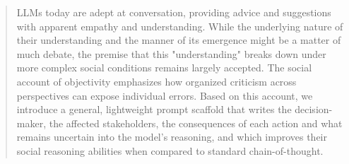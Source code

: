 \begin{abstract}
LLMs today are adept at conversation, providing advice and suggestions with apparent empathy and understanding. While the underlying nature of their understanding and the manner of its emergence might be a matter of much debate, the premise that this "understanding" breaks down under more complex social conditions remains largely accepted. The social account of objectivity emphasizes how organized criticism across perspectives can expose individual errors. Based on this account, we introduce a general, lightweight prompt scaffold that writes the decision-maker, the affected stakeholders, the consequences of each action and what remains uncertain into the model's reasoning, and which improves their social reasoning abilities when compared to standard chain-of-thought.

\end{abstract}
